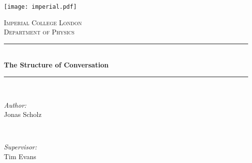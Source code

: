 \begin{titlepage}

\newcommand{\HRule}{\rule{\linewidth}{0.5mm}} %



\texttt{[image: imperial.pdf]}\\[0.5cm] 

\center %


\textsc{\Large Imperial College London}\\[0.5cm] 
\textsc{\large Department of Physics}\\[0.5cm] 


\HRule \\[0.4cm]
{ \huge \bfseries The Structure of Conversation}\\ %
\HRule \\[1.5cm]
 

\begin{minipage}{0.4\textwidth}
\begin{flushleft} \large
\emph{Author:}\\
Jonas Scholz
\end{flushleft}
\end{minipage}
~
\begin{minipage}{0.4\textwidth}
\begin{flushright} \large
\emph{Supervisor:} \\
Tim Evans
\end{flushright}
\end{minipage}\\[4cm]


\vfill %

\end{titlepage}
